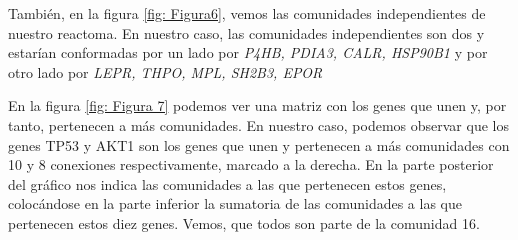 \newpage
También, en la figura \ref{fig: Figura6}, vemos las comunidades independientes de nuestro reactoma. En nuestro caso, las comunidades independientes son dos y estarían conformadas por un lado por \textit{P4HB, PDIA3, CALR, HSP90B1} y por otro lado por \textit{LEPR, THPO, MPL, SH2B3, EPOR}

\begin{minipage}{\linewidth}
	\label{fig: Figura6}
\end{minipage}


En la figura \ref{fig: Figura 7} podemos ver una matriz con los genes que unen y, por tanto, pertenecen a más comunidades. En nuestro caso, podemos observar que los genes TP53 y AKT1 son los genes que unen y pertenecen a más comunidades con 10 y 8 conexiones respectivamente, marcado a la derecha. En la parte posterior del gráfico nos indica las comunidades a las que pertenecen estos genes, colocándose en la parte inferior la sumatoria de las comunidades a las que pertenecen estos diez genes. Vemos, que todos son parte de la comunidad 16.


